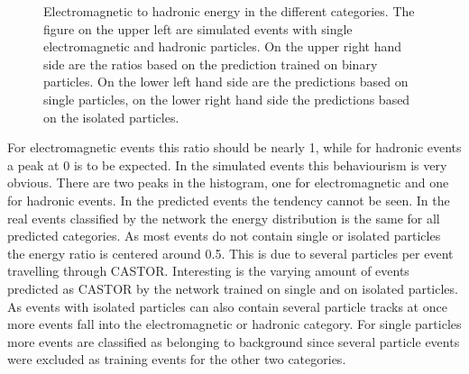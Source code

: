 \begin{figure}
\begin{minipage}{0.45\textwidth}
\end{minipage}
\caption{Electromagnetic to hadronic energy in the different categories. The figure on the upper left are simulated events with single electromagnetic and hadronic particles. On the upper right hand side are the ratios based on the prediction trained on binary particles. On the lower left hand side are the predictions based on single particles, on the lower right hand side the predictions based on the isolated particles.}
\label{ratio}
\end{figure}

For electromagnetic events this ratio should be nearly 1, while for hadronic events a peak at 0 is to be expected. In the simulated events this behaviourism is very obvious. There are two peaks in the histogram, one for electromagnetic and one for hadronic events. In the predicted events the tendency cannot be seen. In the real events classified by the network the energy distribution is the same for all predicted categories. As most events do not contain single or isolated particles the energy ratio is centered around 0.5. This is due to several particles per event travelling through CASTOR. Interesting is the varying amount of events predicted as CASTOR by the network trained on single and on isolated particles. As events with isolated particles can also contain several particle tracks at once more events fall into the electromagnetic or hadronic category. For single particles more events are classified as belonging to background since several particle events were excluded as training events for the other two categories.
 
